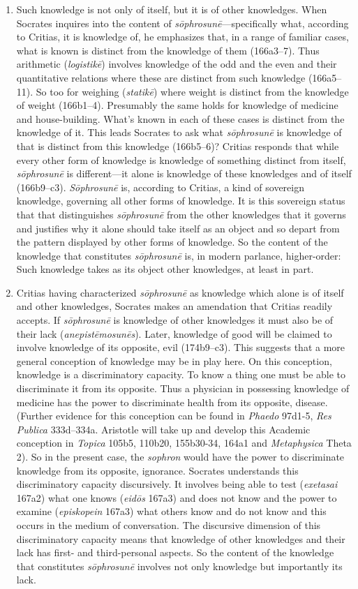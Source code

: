 \begin{enumerate}[(1)]
	\item Such knowledge is not only of itself, but it is of other knowledges. When Socrates inquires into the content of \emph{sōphrosunē}—specifically what, according to Critias, it is knowledge of, he emphasizes that, in a range of familiar cases, what is known is distinct from the knowledge of them (166a3–7). Thus arithmetic (\emph{logistikē}) involves knowledge of the odd and the even and their quantitative relations where these are distinct from such knowledge (166a5–11). So too for weighing (\emph{statikē}) where weight is distinct from the knowledge of weight (166b1–4). Presumably the same holds for knowledge of medicine and house-building. What's known in each of these cases is distinct from the knowledge of it. This leads Socrates to ask what \emph{sōphrosunē} is knowledge of that is distinct from this knowledge (166b5–6)? Critias responds that while every other form of knowledge is knowledge of something distinct from itself, \emph{sōphrosunē} is different—it alone is knowledge of these knowledges and of itself (166b9–c3). \emph{Sōphrosunē} is, according to Critias, a kind of sovereign knowledge, governing all other forms of knowledge. It is this sovereign status that that distinguishes \emph{sōphrosunē} from the other knowledges that it governs and justifies why it alone should take itself as an object and so depart from the pattern displayed by other forms of knowledge. So the content of the knowledge that constitutes \emph{sōphrosunē} is, in modern parlance, higher-order: Such knowledge takes as its object other knowledges, at least in part.
	\item Critias having characterized \emph{sōphrosunē} as knowledge which alone is of itself and other knowledges, Socrates makes an amendation that Critias readily accepts. If \emph{sōphrosunē} is knowledge of other knowledges it must also be of their lack (\emph{anepistēmosunēs}). Later, knowledge of good will be claimed to involve knowledge of its opposite, evil (174b9–c3). This suggests that a more general conception of knowledge may be in play here. On this conception, knowledge is a discriminatory capacity. To know a thing one must be able to discriminate it from its opposite.  Thus a physician in possessing knowledge of medicine has the power to discriminate health from its opposite, disease. (Further evidence for this conception can be found in \emph{Phaedo} 97d1-5, \emph{Res Publica} 333d–334a. Aristotle will take up and develop this Academic conception in \emph{Topica} 105b5, 110b20, 155b30-34, 164a1 and \emph{Metaphysica} Theta 2). So in the present case, the \emph{sophron} would have the power to discriminate knowledge from its opposite, ignorance. Socrates understands this discriminatory capacity discursively. It involves being able to test (\emph{exetasai} 167a2) what one knows (\emph{eidōs} 167a3) and does not know and the power to examine (\emph{episkopein} 167a3) what others know and do not know and this occurs in the medium of conversation. The discursive dimension of this discriminatory capacity means that knowledge of other knowledges and their lack has first- and third-personal aspects. So the content of the knowledge that constitutes \emph{sōphrosunē} involves not only knowledge but importantly its lack. 

\end{enumerate}
